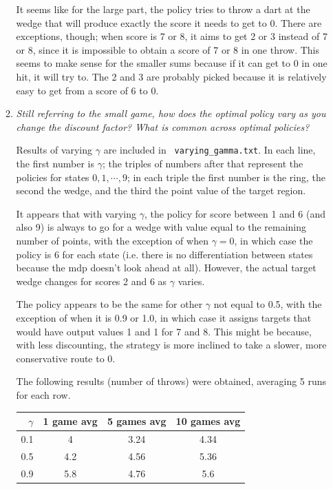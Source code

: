 \documentclass{article}
\newcommand{\edit}[1]{\colorbox{Yellow}{#1}}
\begin{document}
\begin{enumerate}
\begin{enumerate}
    It seems like for the large part, the policy tries to throw a dart
    at the wedge that will produce exactly the score it needs to get
    to 0.  There are exceptions, though; when score is 7 or 8, it aims
    to get 2 or 3 instead of 7 or 8, since it is impossible to obtain
    a score of 7 or 8 in one throw. This seems to make sense for the
    smaller sums because if it can get to 0 in one hit, it will try
    to. The 2 and 3 are probably picked because it is relatively easy
    to get from a score of 6 to 0.

  \item \emph{Still referring to the small game, how does the optimal
    policy vary as you change the discount factor? What is common
    across optimal policies?}

    Results of varying $\gamma$ are included in {\tt
      varying_gamma.txt}. In each line, the first number is $\gamma$;
    the triples of numbers after that represent the policies for
    states $0,1,\cdots,9$; in each triple the first number is the
    ring, the second the wedge, and the third the point value of the
    target region.

    It appears that with varying $\gamma$, the policy for score
    between 1 and 6 (and also 9) is always to go for a wedge with
    value equal to the remaining number of points, with the exception
    of when $\gamma=0$, in which case the policy is 6 for each state
    (i.e. there is no differentiation between states because the mdp
    doesn't look ahead at all). However, the actual target wedge
    changes for scores 2 and 6 as $\gamma$ varies.

    The policy appears to be the same for
    other $\gamma$ not equal to 0.5, with the exception of when it is
    0.9 or 1.0, in which case it assigns targets that would have
    output values 1 and 1 for 7 and 8. This might be because, with
    less discounting, the strategy is more inclined to take a slower,
    more conservative route to 0.


    The following results (number of throws) were obtained, averaging
    5 runs for each row.

    \begin{tabular}{r|c c c}
      $\gamma$ & 1 game avg & 5 games avg & 10 games avg \\
      \hline
      0.1 & 4 & 3.24 & 4.34 \\
      0.5 & 4.2 & 4.56 & 5.36 \\
      0.9 & 5.8 & 4.76 & 5.6 \\
    \end{tabular}


\end{enumerate}
\end{enumerate}
\end{document}
